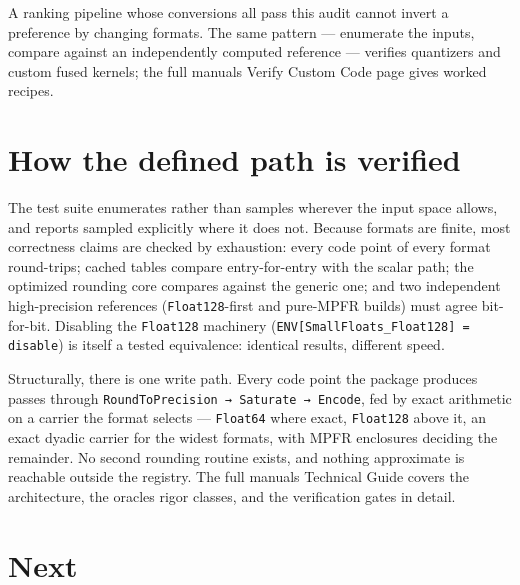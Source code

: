 A ranking pipeline whose conversions all pass this audit cannot invert a preference by changing formats. The same pattern — enumerate the inputs, compare against an independently computed reference — verifies quantizers and custom fused kernels; the full manual{\textquotesingle}s Verify Custom Code page gives worked recipes.



\section{How the defined path is verified}



\label{6804462531286882542}{}


The test suite enumerates rather than samples wherever the input space allows, and reports {\textquotedbl}sampled{\textquotedbl} explicitly where it does not. Because formats are finite, most correctness claims are checked by exhaustion: every code point of every format round-trips; cached tables compare entry-for-entry with the scalar path; the optimized rounding core compares against the generic one; and two independent high-precision references (\texttt{Float128}-first and pure-MPFR builds) must agree bit-for-bit. Disabling the \texttt{Float128} machinery (\texttt{ENV[{\textquotedbl}SmallFloats\_Float128{\textquotedbl}] = {\textquotedbl}disable{\textquotedbl}}) is itself a tested equivalence: identical results, different speed.



Structurally, there is one write path. Every code point the package produces passes through \texttt{RoundToPrecision → Saturate → Encode}, fed by exact arithmetic on a carrier the format selects — \texttt{Float64} where exact, \texttt{Float128} above it, an exact dyadic carrier for the widest formats, with MPFR enclosures deciding the remainder. No second rounding routine exists, and nothing approximate is reachable outside the registry. The full manual{\textquotesingle}s Technical Guide covers the architecture, the oracle{\textquotesingle}s rigor classes, and the verification gates in detail.



\section{Next}



\label{9862256287407127426}{}


